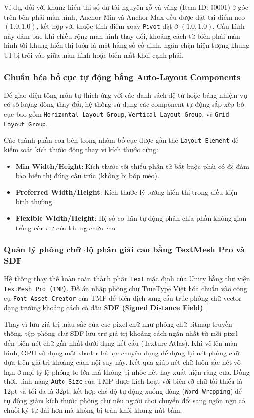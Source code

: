 \documentclass[../Project.tex]{subfiles}
\begin{document}
Ví dụ, đối với khung hiển thị số dư tài nguyên gỗ và vàng (Item ID: 00001) ở góc trên bên phải màn hình, Anchor Min và Anchor Max đều được đặt tại điểm neo \((1.0, 1.0)\), kết hợp với thuộc tính điểm xoay \texttt{Pivot} đặt ở \((1.0, 1.0)\). Cấu hình này đảm bảo khi chiều rộng màn hình thay đổi, khoảng cách từ biên phải màn hình tới khung hiển thị luôn là một hằng số cố định, ngăn chặn hiện tượng khung UI bị trôi vào giữa màn hình hoặc biến mất khỏi cạnh phải.

\subsubsection{Chuẩn hóa bố cục tự động bằng Auto-Layout Components}
Để giao diện tông môn tự thích ứng với các danh sách đệ tử hoặc bảng nhiệm vụ có số lượng dòng thay đổi, hệ thống sử dụng các component tự động sắp xếp bố cục bao gồm \texttt{Horizontal Layout Group}, \texttt{Vertical Layout Group}, và \texttt{Grid Layout Group}. 

Các thành phần con bên trong nhóm bố cục được gắn thẻ \texttt{Layout Element} để kiểm soát kích thước động thay vì kích thước cứng:
\begin{itemize}
    \item \textbf{Min Width/Height}: Kích thước tối thiểu phần tử bắt buộc phải có để đảm bảo hiển thị đúng cấu trúc (không bị bóp méo).
    \item \textbf{Preferred Width/Height}: Kích thước lý tưởng hiển thị trong điều kiện bình thường.
    \item \textbf{Flexible Width/Height}: Hệ số co dãn tự động phân chia phần không gian trống còn dư của khung chứa cha.
\end{itemize}

\subsubsection{Quản lý phông chữ độ phân giải cao bằng TextMesh Pro và SDF}
Hệ thống thay thế hoàn toàn thành phần \texttt{Text} mặc định của Unity bằng thư viện \texttt{TextMesh Pro (TMP)}. Đồ án nhập phông chữ TrueType Việt hóa chuẩn vào công cụ \texttt{Font Asset Creator} của TMP để biên dịch sang cấu trúc phông chữ vector dạng trường khoảng cách có dấu \textbf{SDF (Signed Distance Field)}. 

Thay vì lưu giá trị màu sắc của các pixel chữ như phông chữ bitmap truyền thống, tệp phông chữ SDF lưu trữ giá trị khoảng cách ngắn nhất từ mỗi pixel đến biên nét chữ gần nhất dưới dạng kết cấu (Texture Atlas). Khi vẽ lên màn hình, GPU sử dụng một shader bộ lọc chuyên dụng để dựng lại nét phông chữ dựa trên giá trị khoảng cách nội suy này. Kết quả giúp nét chữ luôn sắc nét vô hạn ở mọi tỷ lệ phóng to lớn mà không bị nhòe nét hay xuất hiện răng cưa. Đồng thời, tính năng \texttt{Auto Size} của TMP được kích hoạt với biên cỡ chữ tối thiểu là \(12\text{pt}\) và tối đa là \(32\text{pt}\), kết hợp chế độ tự động xuống dòng (\texttt{Word Wrapping}) để tự động giảm kích thước phông chữ nếu người chơi chuyển đổi sang ngôn ngữ có chuỗi ký tự dài hơn mà không bị tràn khỏi khung nút bấm.
\end{document}
